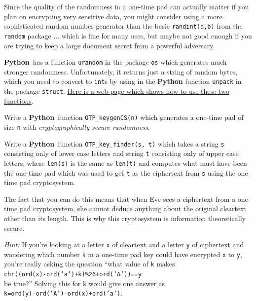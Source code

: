 \documentclass[12pt,letterpaper]{amsbook}
\theoremstyle{definition}
\theoremstyle{remark}
\numberwithin{figure}{section}
\numberwithin{exercise}{chapter}
\numberwithin{section}{chapter}
\numberwithin{equation}{section}
\numberwithin{table}{subsection}
\newcommand{\code}[1]{\colorbox{lg}{\texttt{#1}}}
\newcommand{\Python}{{\textbf{\ix{Python}}}}
\newcommand{\blue}[1]{{\color{blue}#1}}
\newcommand{\bhref}[2]{{\href{#1}{\blue{#2}}}}
\newcommand{\ix}[1]{{#1}\index{#1}}
\begin{document}
\vskip2mm
\begin{BTtcb}[label=bt:OTPkeygen_better_rand]{}{}
 Since the quality of the randomness in a one-time pad can actually matter if
 you plan on encrypting very sensitive data, you might consider using a more
 sophisticated random number generator than the basic \code{randint(a,b)}
 from the \code{random} package ... which is fine for many uses, but maybe
 not good enough if you are trying to keep a large document secret from a
 powerful adversary.

 \Python\ has a function \code{urandom} in the package \code{os}
 which generates much stronger randomness.  Unfortunately, it returns just a
 string of random bytes, which you need to convert to \code{int}s by
 using in the {\Python} function \code{unpack} in the package
 \code{struct}.  \bhref{https://pynative.com/cryptographically-secure-random-data-in-python/}{Here is a web page which shows how to use these
 two functions}.

 Write a \Python\ function \code{OTP\_keygenCS(n)} which generates a
 one-time pad of size \code{n} with
 \textit{cryptographically secure randomness}.
\end{BTtcb}

\vskip2mm
\begin{CTtcb}[label=ct:OTPkeyfinder]{}{}
 Write a \Python\ function \code{OTP\_key\_finder(s, t)} which takes
 a string \code{s} consisting only of lower case letters and string
 \code{t} consisting only of upper case letters, where \code{len(s)}
 is the same as \code{len(t)} and computes what must have been the
 one-time pad which was used to get \code{t} as the ciphertext from
 \code{s} using the one-time pad cryptosystem.

 The fact that you can do this means that when Eve sees a ciphertext from
 a one-time pad cryptosystem, she cannot deduce anything about the original
 cleartext other than its length.  This is why this cryptosystem is information
 theoretically secure.

 \textit{Hint:} If you're looking at a letter \code{x} of cleartext and
 a letter \code{y} of ciphertext and wondering which number \code{k}
 in a one-time pad key could have encrypted \code{x} to \code{y},
 you're really asking the question ``what value of \code{k} makes\\
 \hphantom{XXX}\code{chr((ord(x)-ord('a')+k)\%26+ord('A'))==y}\\
 be true?''  Solving this
 for \code{k} would give one answer as\\
 \hphantom{XXX}\code{k=ord(y)-ord('A')-ord(x)+ord('a')}.
\end{CTtcb}
\end{document}
